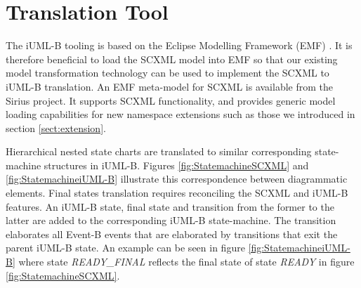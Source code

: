 
\section{Translation Tool}

The iUML-B tooling is based on the Eclipse Modelling Framework (EMF) \cite{steinberg2009emf}. 
It is therefore beneficial to load the SCXML model into EMF so that 
our existing model transformation technology can be used to 
implement the SCXML to iUML-B translation. An EMF meta-model for SCXML 
is available from the Sirius \cite{siriuswebsite}
project. It supports SCXML functionality, and provides generic model
loading capabilities for new namespace extensions such as those we 
introduced in section \ref{sect:extension}.

Hierarchical nested state charts are translated to similar corresponding  state-machine structures in iUML-B.  
Figures \ref{fig:StatemachineSCXML} and \ref{fig:StatemachineiUML-B} illustrate this correspondence between diagrammatic elements. Final states translation requires reconciling the SCXML and iUML-B features.
An iUML-B state, final state and transition from the former to the latter are  added to the corresponding iUML-B state-machine. 
The transition elaborates  all Event-B events that are elaborated by transitions that exit the parent  iUML-B state. 
An example can be seen in figure \ref{fig:StatemachineiUML-B} where state \emph{READY\_FINAL} reflects the final state of state \emph{READY} in figure \ref{fig:StatemachineSCXML}.





